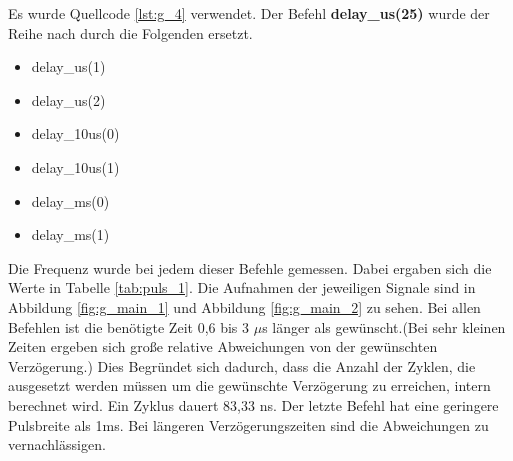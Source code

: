 \documentclass[12pt,a4paper]{article}
\begin{document}
Es wurde Quellcode \ref{lst:g_4} verwendet. Der Befehl \textbf{delay\_us(25)} wurde der Reihe nach durch die Folgenden ersetzt.

\begin{itemize}
\item	delay\_us(1)

\item	delay\_us(2)

\item	delay\_10us(0)

\item	delay\_10us(1)

\item	delay\_ms(0)

\item	delay\_ms(1)
\end{itemize}
 Die Frequenz wurde bei jedem dieser Befehle gemessen.
 Dabei ergaben sich die Werte in Tabelle \ref{tab:puls_1}. Die Aufnahmen der jeweiligen Signale sind in Abbildung \ref{fig:g_main_1} und Abbildung \ref{fig:g_main_2} zu sehen. Bei allen Befehlen ist die benötigte Zeit 0,6 bis 3 $\mu$s länger als gewünscht.(Bei sehr kleinen Zeiten ergeben sich große relative Abweichungen von der gewünschten Verzögerung.) Dies Begründet sich dadurch, dass die Anzahl der Zyklen, die ausgesetzt werden müssen um die gewünschte Verzögerung zu erreichen, intern berechnet wird. Ein Zyklus dauert 83,33 ns. Der letzte Befehl hat eine geringere Pulsbreite als 1ms. Bei längeren Verzögerungszeiten sind die Abweichungen zu vernachlässigen.
\end{document}
